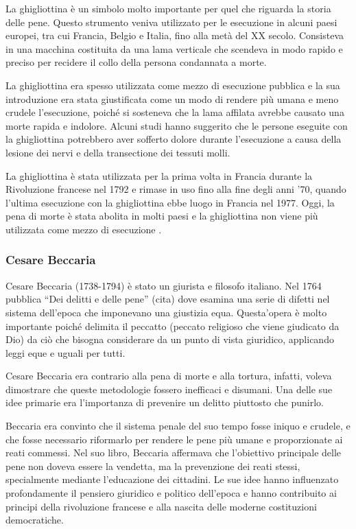 \documentclass[a4paper, 12pt]{article}
\newcommand{\quotes}[1]{``#1''}
\begin{document}
La ghigliottina è un simbolo molto importante per quel che riguarda
la storia delle pene.
Questo strumento veniva utilizzato per le esecuzione in alcuni paesi europei,
tra cui Francia, Belgio e Italia, fino alla metà del XX secolo.
Consisteva in una macchina costituita da una lama
verticale che scendeva in modo rapido e preciso per recidere il
collo della persona condannata a morte.

La ghigliottina era spesso utilizzata come mezzo di esecuzione pubblica
e la sua introduzione era stata giustificata come un modo di rendere più umana
e meno crudele l'esecuzione, poiché si sosteneva che la lama affilata
avrebbe causato una morte rapida e indolore.
Alcuni studi hanno suggerito che le persone eseguite con la
ghigliottina potrebbero aver sofferto dolore durante l'esecuzione
a causa della lesione dei nervi e della transectione dei tessuti molli.

La ghigliottina è stata utilizzata per la prima volta in Francia durante la Rivoluzione francese
nel 1792 e rimase in uso fino alla fine degli anni '70,
quando l'ultima esecuzione con la ghigliottina ebbe luogo in Francia nel 1977.
Oggi, la pena di morte è stata abolita in molti paesi e la ghigliottina non viene più
utilizzata come mezzo di esecuzione \cite{ghigliottina}.

\subsubsection{Cesare Beccaria}

Cesare Beccaria (1738-1794) è stato un giurista e filosofo italiano.
Nel 1764 pubblica \quotes{Dei delitti e delle pene} (cita) 
dove esamina una serie di difetti nel sistema dell'epoca che imponevano una giustizia equa.
Questa'opera è molto importante poiché delimita il peccatto (peccato religioso
che viene giudicato da Dio) da ciò che bisogna considerare da un punto di vista giuridico,
applicando leggi eque e uguali per tutti.

Cesare Beccaria era contrario alla pena di morte e alla tortura, infatti,
voleva dimostrare che queste metodologie fossero inefficaci e disumani.
Una delle sue idee primarie era l'importanza di prevenire un delitto piuttosto che punirlo.

Beccaria era convinto che il sistema penale del suo tempo fosse iniquo e crudele,
e che fosse necessario riformarlo per rendere le pene più umane e proporzionate ai reati commessi.
Nel suo libro, Beccaria affermava che l'obiettivo principale delle pene non doveva essere la vendetta,
ma la prevenzione dei reati stessi, specialmente mediante l'educazione dei cittadini.
Le sue idee hanno influenzato profondamente il pensiero giuridico e politico dell'epoca
e hanno contribuito ai principi della rivoluzione francese e alla nascita delle moderne
costituzioni democratiche.
\end{document}
